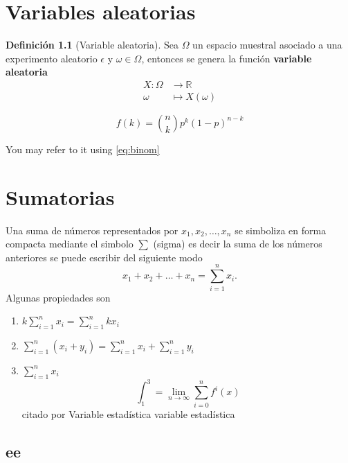 \documentclass[
  11pt,
]{krantz}
\providecommand{\tightlist}{%
  \setlength{\itemsep}{0pt}\setlength{\parskip}{0pt}}
\theoremstyle{definition}
\newtheorem{definition}{Definición}[chapter]
\theoremstyle{definition}
\theoremstyle{definition}
\theoremstyle{definition}
\theoremstyle{remark}
\begin{document}
\hypertarget{variables-aleatorias}{%
\chapter{Variables aleatorias}\label{variables-aleatorias}}

\begin{definition}[Variable aleatoria]
Sea \(\Omega\) un espacio muestral asociado a una experimento aleatorio \(\epsilon\) y \(\omega\in\Omega\), entonces se genera la función \textbf{variable aleatoria}
\begin{align*}
  X:\Omega&\longrightarrow \mathbb{R}\\
  \omega&\longmapsto X(\omega)
\end{align*}
\end{definition}

\begin{equation}
  f\left(k\right) = \binom{n}{k} p^k\left(1-p\right)^{n-k}
  \label{eq:binom}
\end{equation}

You may refer to it using \eqref{eq:binom}

\hypertarget{appendix-apendice}{%
\appendix {}}


\hypertarget{sumatorias}{%
\chapter{Sumatorias}\label{sumatorias}}

Una suma de números representados por \(x_1, x_2, \ldots, x_n\) se simboliza en forma compacta mediante el simbolo \(\sum\) (sigma) es decir la suma de los números anteriores se puede escribir del siguiente modo \[x_1+x_2+\dots+x_n=\sum_{i=1}^nx_i.\]
Algunas propiedades son

\begin{enumerate}
\def\labelenumi{\arabic{enumi}.}
\tightlist
\item
  \(k\sum_{i=1}^nx_i=\sum_{i=1}^nkx_i\)
\item
  \(\sum_{i=1}^n\left(x_i+y_i\right)=\sum_{i=1}^nx_i+\sum_{i=1}^ny_i\)
\item
  \(\sum_{i=1}^nx_i\)
  \[\int_1^3=\lim_{n\to \infty}\sum_{i=0}^{n}f^i(x)\]
  citado por \citep{xie2015}
  Variable estadística variable estadística
\end{enumerate}

\hypertarget{ee}{%
\section{ee}\label{ee}}
\end{document}
